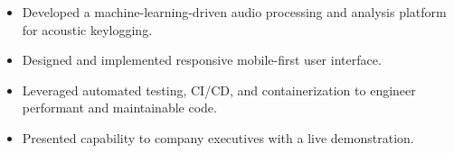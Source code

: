 \documentclass[10pt,a4paper,ragged2e,withhyper]{altacv}
\begin{document}


\divider{}

\begin{itemize}
\item Developed a machine-learning-driven audio processing and analysis platform for acoustic keylogging.
\item Designed and implemented responsive mobile-first user interface.
\item Leveraged automated testing, CI/CD, and containerization to engineer performant and maintainable code.
\item Presented capability to company executives with a live demonstration.
\end{itemize}




\end{document}
